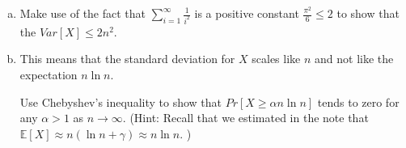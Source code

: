 \documentclass[11pt]{article}
\newif\ifsolutions
\begin{document}
\begin{enumerate}
\begin{enumerate}[a)]
\item Make use of the fact that $\sum\nolimits_{i=1}^{\infty}
  \frac{1}{i^2}$ is a positive constant $\frac{\pi^2}{6} \leq 2$ to show that the $Var[X] \leq 2n^2$.
\vspace{20mm}

\ifsolutions{\color{blue}{

\vspace{-20mm}
We use the fact that the $X_i$'s are independent, 
\begin{align*}
Var[X] &= \sum\nolimits_{i=1}^{n} Var[X_i] \\ 
&\leq \sum\nolimits_{i=1}^{n} \left(\frac{n}{n-i+1}\right)^2 \\
&= n^2\sum\nolimits_{j=1}^{n} \frac{1}{j^2} \\
&\leq n^2\sum\nolimits_{j=1}^{\infty} \frac{1}{j^2} \\
&\leq 2n^2
\end{align*}
}}\fi

\item This means that the standard deviation for $X$ scales like $n$
  and not like the expectation $n \ln n$. 

 Use Chebyshev's inequality to show that $Pr[ X \geq \alpha n
  \ln{n}]$ tends to zero for any $\alpha > 1$ as $n \rightarrow
  \infty$. (Hint: Recall that we estimated in the note that
  $\mathbb{E}[X] \approx n(\ln{n} + \gamma) \approx n \ln{n}$. ) 
\vspace{25mm}

\ifsolutions{\color{blue}{ 
\vspace{-25mm}

\begin{align*}
Pr[ X \geq \alpha n\ln{n}] &\approx Pr[ X \geq (\alpha-1)n\ln{n} + \mathbb{E}[X]] \\ 
&=  Pr[ X - \mathbb{E}[X] \geq (\alpha - 1)n\ln{n} ] \\
&\leq Pr[ | X - \mathbb{E}[X] | \geq (\alpha-1)n\ln{n} ] \\
&\leq \frac{Var[X]}{((\alpha-1)n\ln{n})^2} \\
&\leq \frac{2n^2}{((\alpha-1)^2n^2(\ln{n})^2} \\
&= \frac{2}{(\alpha-1)^2(\ln{n})^2} \\
& \lim_{n \to \infty} \frac{2}{(\alpha-1)^2(\ln{n})^2}  = 0 \\
\end{align*}
}}\fi


\end{enumerate}


\end{enumerate}
\end{document}
